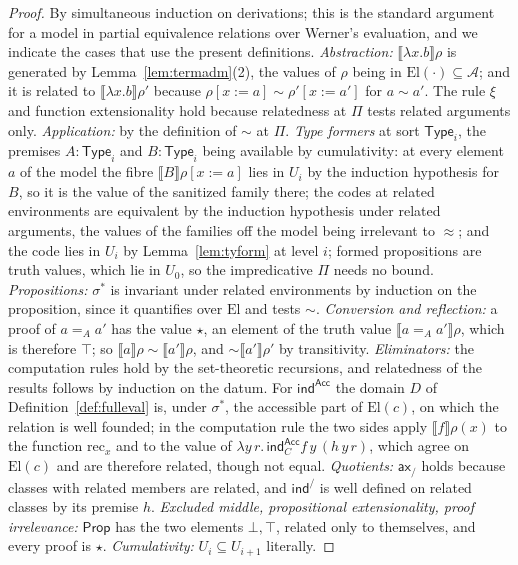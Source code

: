 \documentclass[10pt]{article}
\newcommand{\Prop}{\mathsf{Prop}}
\newcommand{\Type}{\mathsf{Type}}
\newcommand{\sem}[1]{\llbracket #1\rrbracket}
\newcommand{\El}{\mathrm{El}}
\begin{document}
\begin{proof}
By simultaneous induction on derivations; this is the standard argument
for a model in partial equivalence relations over Werner's evaluation,
and we indicate the cases that use the present definitions.
\emph{Abstraction:} $\sem{\lambda x.b}\rho$ is generated by
Lemma~\ref{lem:termadm}(2), the values of $\rho$ being in
$\El(\cdot)\subseteq\mathcal A$; and it is related to
$\sem{\lambda x.b}\rho'$ because $\rho[x{:=}a]\sim\rho'[x{:=}a']$ for
$a\sim a'$. The rule $\xi$ and function extensionality hold because
relatedness at $\Pi$ tests related arguments only. \emph{Application:}
by the definition of $\sim$ at $\Pi$. \emph{Type formers} at sort
$\Type_i$, the premises $A:\Type_i$ and $B:\Type_i$ being available by
cumulativity: at every element $a$ of the model the fibre
$\sem B\rho[x{:=}a]$ lies in $U_i$ by the induction hypothesis for $B$,
so it is the value of the sanitized family there; the codes at related
environments are equivalent by the induction hypothesis under related
arguments, the values of the families off the model being irrelevant to
$\approx$; and the code lies in $U_i$ by Lemma~\ref{lem:tyform} at level
$i$;
formed propositions are truth values, which lie in $U_0$, so the
impredicative $\Pi$ needs no bound. \emph{Propositions:} $\sigma^*$ is
invariant under related environments by induction on the proposition,
since it quantifies over $\El$ and tests $\sim$. \emph{Conversion and
reflection:} a proof of $a=_Aa'$ has the value $\star$, an element of the
truth value $\sem{a=_Aa'}\rho$, which is therefore $\top$; so
$\sem a\rho\sim\sem{a'}\rho$, and $\sim\sem{a'}\rho'$ by transitivity.
\emph{Eliminators:} the computation rules hold by the set-theoretic
recursions, and relatedness of the results follows by induction on the
datum. For $\mathsf{ind}^{\mathsf{Acc}}$ the domain $D$ of
Definition~\ref{def:fulleval} is, under $\sigma^*$, the accessible part
of $\El(c)$, on which the relation is well founded; in the computation
rule the two sides apply $\sem f\rho(x)$ to the function
$\mathrm{rec}_x$ and to the value of $\lambda y\,r.\,\mathsf{ind}^{\mathsf{Acc}}_Cf\,y\,(h\,y\,r)$,
which agree on $\El(c)$ and are therefore related, though not equal.
\emph{Quotients:} $\mathsf{ax}_/$ holds because classes with related
members are related, and $\mathsf{ind}^/$ is well defined on related
classes by its premise $h$. \emph{Excluded middle, propositional
extensionality, proof irrelevance:} $\Prop$ has the two elements
$\bot,\top$, related only to themselves, and every proof is $\star$.
\emph{Cumulativity:} $U_i\subseteq U_{i+1}$ literally.
\end{proof}
\end{document}
